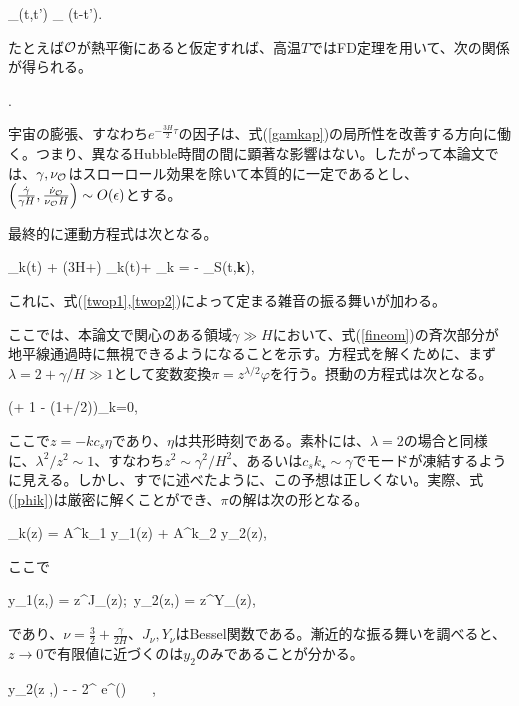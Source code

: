 \beq
\label{twop2}
\tilde \nu_{\calo}(t,t') \simeq \nu_{\calo} \delta(t-t').
\eeq

たとえば${\cal O}$が熱平衡にあると仮定すれば、高温$T$ではFD定理を用いて、次の関係が得られる。

\beq \label{fdthg}\gamma \simeq {}.\eeq

宇宙の膨張、すなわち$e^{-\frac{3H}{2}\tau}$の因子は、式(\ref{gamkap})の局所性を改善する方向に働く。つまり、異なるHubble時間の間に顕著な影響はない。したがって本論文では、$\gamma,\nu_{{\cal O}}$はスローロール効果を除いて本質的に一定であるとし、$\left(\frac{\dot\gamma}{\gamma H},\frac{\dot\nu_{{\cal O}}}{\nu_{{\cal O}}H}\right)\sim O(\epsilon)$とする。

最終的に運動方程式は次となる。

\beq
\label{fineom}
\ddot\pi_k(t) + (3H+\gamma) \dot\pi_k(t)+  \pi_k = - \delta\calo_S(t,{\bf k}),
\eeq

これに、式(\ref{twop1},\ref{twop2})によって定まる雑音の振る舞いが加わる。

\label{homog}

ここでは、本論文で関心のある領域$\gamma\gg H$において、式(\ref{fineom})の斉次部分が地平線通過時に無視できるようになることを示す。方程式を解くために、まず$\lambda=2+\gamma/H\gg1$として変数変換$\pi=z^{\lambda/2}\varphi$を行う。摂動の方程式は次となる。

\beq
\label{phik}
\left(+ 1 - (1+\lambda/2)\right)\varphi_k=0,
\eeq

ここで$z=-kc_s\eta$であり、$\eta$は共形時刻である。素朴には、$\lambda=2$の場合と同様に、$\lambda^2/z^2\sim1$、すなわち$z^2\sim\gamma^2/H^2$、あるいは$c_sk_\star\sim\gamma$でモードが凍結するように見える。しかし、すでに述べたように、この予想は正しくない。実際、式(\ref{phik})は厳密に解くことができ、$\pi$の解は次の形となる。

\beq
\pi_k(z) = A^k_1 y_1(z) + A^k_2 y_2(z),
\eeq

ここで

\beq
\label{soleq}
y_1(z,\nu) = z^{\nu}J_\nu(z);~y_2(z,\nu) = z^\nu Y_\nu(z),
\eeq

であり、$\nu=\frac{3}{2}+\frac{\gamma}{2H}$、$J_\nu,Y_\nu$はBessel関数である。漸近的な振る舞いを調べると、$z\to0$で有限値に近づくのは$y_2$のみであることが分かる。

\beq
y_2(z  ,\nu) \to - \Gamma[\nu] \simeq - 2^\nu \sqrt{\frac{2\nu}{\pi}} e^{\nu(\log{})}  ~~~\nu {},
\eeq


